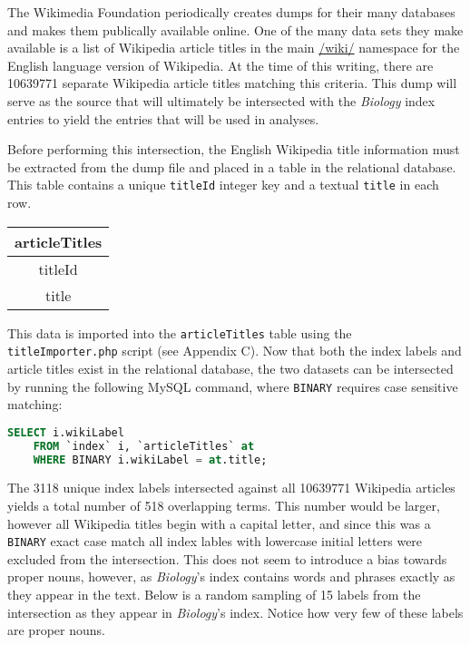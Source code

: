 The Wikimedia Foundation periodically creates dumps for their many databases and makes them publically available online\cite{wiki-dumps}.
One of the many data sets they make available is a list of Wikipedia article titles in the main \url{/wiki/} namespace for the English language version of Wikipedia\cite{wiki-dump-titles}.
At the time of this writing, there are 10639771 separate Wikipedia article titles matching this criteria.
This dump will serve as the source that will ultimately be intersected with the {\it Biology} index entries to yield the entries that will be used in analyses.

Before performing this intersection, the English Wikipedia title information must be extracted from the dump file and placed in a table in the relational database.
This table contains a unique {\tt titleId} integer key and a textual {\tt title} in each row.

\begin{center}
\begin{tabular}{|c|}
\hline 
{\bf articleTitles} \\ 
\hline 
titleId \\ 
\hline 
title \\ 
\hline 
\end{tabular} 
\end{center}

This data is imported into the {\tt articleTitles} table using the {\tt titleImporter.php} script (see Appendix C).
Now that both the index labels and article titles exist in the relational database, the two datasets can be intersected by running the following MySQL command, where {\tt BINARY} requires case sensitive matching:

\begin{lstlisting}[language=SQL]
SELECT i.wikiLabel
    FROM `index` i, `articleTitles` at
    WHERE BINARY i.wikiLabel = at.title;
\end{lstlisting}

The 3118 unique index labels intersected against all 10639771 Wikipedia articles yields a total number of 518 overlapping terms.
This number would be larger, however all Wikipedia titles begin with a capital letter, and since this was a {\tt BINARY} exact case match all index lables with lowercase initial letters were excluded from the intersection.
This does not seem to introduce a bias towards proper nouns, however, as {\it Biology}'s index contains words and phrases exactly as they appear in the text.
Below is a random sampling of 15 labels from the intersection as they appear in {\it Biology}'s index.
Notice how very few of these labels are proper nouns.

